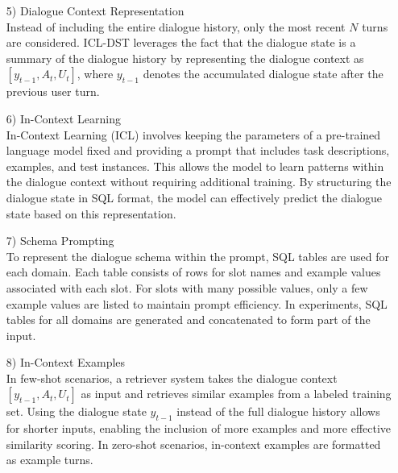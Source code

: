 \documentclass[conference]{IEEEtran}
\begin{document}
\begin{enumerate}
\begin{itemize}
\begin{itemize}
\begin{enumerate}
\begin{itemize}
    \item [5)] Dialogue Context Representation \\
Instead of including the entire dialogue history, only the most recent \( N \) turns are considered. ICL-DST leverages the fact that the dialogue state is a summary of the dialogue history by representing the dialogue context as \( [y_{t-1}, A_t, U_t] \), where \( y_{t-1} \) denotes the accumulated dialogue state after the previous user turn. \\
\end{itemize}

\begin{itemize}
    \item [6)] In-Context Learning \\
In-Context Learning (ICL) involves keeping the parameters of a pre-trained language model fixed and providing a prompt that includes task descriptions, examples, and test instances. This allows the model to learn patterns within the dialogue context without requiring additional training. By structuring the dialogue state in SQL format, the model can effectively predict the dialogue state based on this representation. \\
\end{itemize}

\begin{itemize}
    \item [7)] Schema Prompting \\
To represent the dialogue schema within the prompt, SQL tables are used for each domain. Each table consists of rows for slot names and example values associated with each slot. For slots with many possible values, only a few example values are listed to maintain prompt efficiency. In experiments, SQL tables for all domains are generated and concatenated to form part of the input. \\ 
\end{itemize}

\begin{itemize}
    \item [8)] In-Context Examples \\
In few-shot scenarios, a retriever system takes the dialogue context \( [y_{t-1}, A_t, U_t] \) as input and retrieves similar examples from a labeled training set. Using the dialogue state \( y_{t-1} \) instead of the full dialogue history allows for shorter inputs, enabling the inclusion of more examples and more effective similarity scoring. In zero-shot scenarios, in-context examples are formatted as example turns. \\
\end{itemize}


\end{enumerate}
\end{itemize}
\end{itemize}
\end{enumerate}
\end{document}
